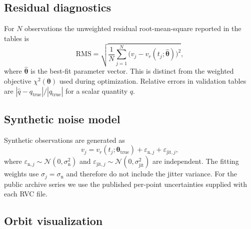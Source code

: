 \documentclass[11pt]{article}
\begin{document}
\subsection*{Residual diagnostics}

For $N$ observations the unweighted residual root-mean-square reported in the
tables is
\begin{equation}
\mathrm{RMS}
=
\sqrt{\frac{1}{N}\sum_{j=1}^{N}\bigl(v_j - v_r(t_j;\hat{\boldsymbol{\theta}})\bigr)^2},
\end{equation}
where $\hat{\boldsymbol{\theta}}$ is the best-fit parameter vector. This is
distinct from the weighted objective $\chi^2(\boldsymbol{\theta})$ used during
optimization. Relative errors in validation tables are
$|\hat{q}-q_{\mathrm{true}}|/|q_{\mathrm{true}}|$ for a scalar quantity $q$.

\subsection*{Synthetic noise model}

Synthetic observations are generated as
\begin{equation}
v_j
=
v_r(t_j;\boldsymbol{\theta}_{\mathrm{true}})
+
\varepsilon_{\mathrm{n},j}
+
\varepsilon_{\mathrm{jit},j},
\end{equation}
where $\varepsilon_{\mathrm{n},j}\sim\mathcal{N}(0,\sigma_{\mathrm{n}}^2)$ and
$\varepsilon_{\mathrm{jit},j}\sim\mathcal{N}(0,\sigma_{\mathrm{jit}}^2)$ are
independent. The fitting weights use
$\sigma_j = \sigma_{\mathrm{n}}$ and therefore do not include the jitter
variance. For the public archive series we use the published per-point
uncertainties supplied with each RVC file.

\subsection*{Orbit visualization}
\end{document}
